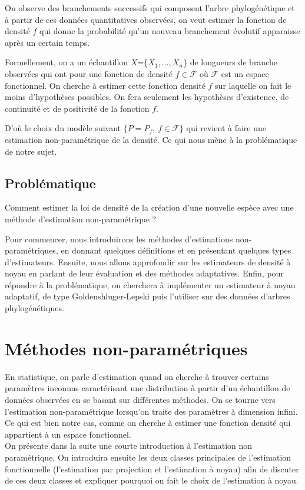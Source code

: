 \documentclass[
]{book}
\begin{document}
\hspace*{0.5cm}

On observe des branchements successifs qui composent l'arbre
phylogénétique et à partir de ces données quantitatives observées, on
veut estimer la fonction de densité \(f\) qui donne la probabilité
qu'un nouveau branchement évolutif apparaisse après un certain temps.

Formellement, on a un échantillon \(X\)=\{\(X_1,\dots,X_n\)\} de longueurs de branche observées qui ont pour
une fonction de densité \(f \in \mathcal F\) où \(\mathcal F\) est un espace
fonctionnel. On cherche à estimer cette fonction densité \(f\) sur laquelle on fait le moins d'hypothèses possibles. On fera seulement les hypothèses d'existence, de continuité et de positivité de la fonction \(f\).

D'où le choix du modèle suivant \(\{P=P_f,~f\in \mathcal F\}\) qui revient à faire une estimation
non-paramétrique de la densité. Ce qui nous mène à la problématique de notre sujet.

\hypertarget{probluxe9matique}{%
\section{Problématique}\label{probluxe9matique}}

Comment estimer la loi de densité de la création d'une nouvelle espèce
avec une méthode d'estimation non-paramétrique ?

Pour commencer, nous introduirons les méthodes d'estimations non-paramétriques, en donnant quelques définitions et en présentant quelques types d'estimateurs.
Ensuite, nous allons approfondir sur les estimateurs de densité à noyau en parlant de leur évaluation et des méthodes adaptatives.
Enfin, pour répondre à la problématique, on cherchera à implémenter un estimateur à noyau adaptatif, de type Goldenshluger-Lepski puis l'utiliser sur des données d'arbres phylogénétiques.

\hypertarget{muxe9thodes-non-paramuxe9triques}{%
\chapter{Méthodes non-paramétriques}\label{muxe9thodes-non-paramuxe9triques}}

\hspace*{0.5cm} En statistique, on parle d'estimation quand on cherche à trouver certains paramètres inconnus caractérisant une distribution à partir d'un échantillon de données observées en se basant sur différentes méthodes.
On se tourne vers l'estimation non-paramétrique lorsqu'on traite des paramètres à dimension infini. Ce qui est bien notre cas, comme on cherche à estimer une fonction densité qui appartient à un espace fonctionnel.\\
\hspace*{0.5cm} On présente dans la suite une courte introduction
à l'estimation non paramétrique. On introduira ensuite les deux classes
principales de l'estimation fonctionnelle (l'estimation par projection
et l'estimation à noyau) afin de discuter de ces
deux classes et expliquer pourquoi on fait le choix de l'estimation à noyau.
\end{document}
